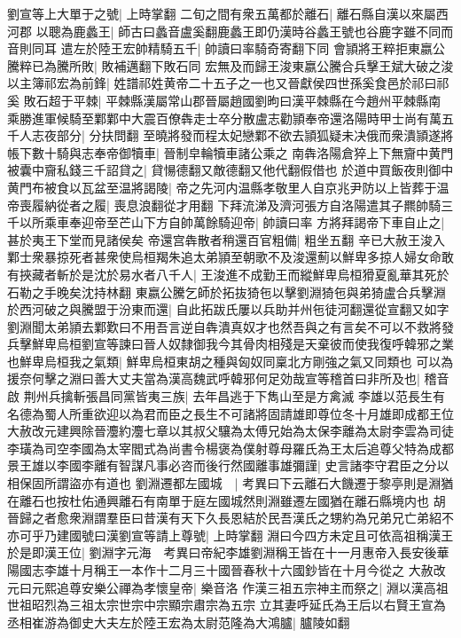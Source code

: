 劉宣等上大單于之號|{
	上時掌翻}
二旬之間有衆五萬都於離石|{
	離石縣自漢以來屬西河郡}
以聰為鹿蠡王|{
	師古曰蠡音盧奚翻鹿蠡王即仍漢時谷蠡王號也谷鹿字雖不同而音則同耳}
遣左於陸王宏帥精騎五千|{
	帥讀曰率騎奇寄翻下同}
會頴將王粹拒東嬴公騰粹已為騰所敗|{
	敗補邁翻下敗石同}
宏無及而歸王浚東嬴公騰合兵擊王斌大破之浚以主簿祁宏為前鋒|{
	姓譜祁姓黄帝二十五子之一也又晉獻侯四世孫奚食邑於祁曰祁奚}
敗石超于平棘|{
	平棘縣漢屬常山郡晉屬趙國劉昫曰漢平棘縣在今趙州平棘縣南}
乘勝進軍候騎至鄴鄴中大震百僚犇走士卒分散盧志勸頴奉帝還洛陽時甲士尚有萬五千人志夜部分|{
	分扶問翻}
至曉將發而程太妃戀鄴不欲去頴狐疑未决俄而衆潰頴遂將帳下數十騎與志奉帝御犢車|{
	晉制皁輪犢車諸公乘之}
南犇洛陽倉猝上下無齎中黄門被囊中齎私錢三千詔貸之|{
	貸愓德翻又敵德翻又他代翻假借也}
於道中買飯夜則御中黄門布被食以瓦盆至温將謁陵|{
	帝之先河内温縣孝敬里人自京兆尹防以上皆葬于温}
帝喪履納從者之履|{
	喪息浪翻從才用翻}
下拜流涕及濟河張方自洛陽遣其子羆帥騎三千以所乘車奉迎帝至芒山下方自帥萬餘騎迎帝|{
	帥讀曰率}
方將拜謁帝下車自止之|{
	甚於夷王下堂而見諸侯矣}
帝還宫犇散者稍還百官粗備|{
	粗坐五翻}
辛已大赦王浚入鄴士衆暴掠死者甚衆使烏桓羯朱追太弟頴至朝歌不及浚還薊以鮮卑多掠人婦女命敢有挾藏者斬於是沈於易水者八千人|{
	王浚進不成勤王而縱鮮卑烏桓猾夏亂華其死於石勒之手晚矣沈持林翻}
東嬴公騰乞師於拓抜猗㐌以擊劉淵猗㐌與弟猗盧合兵擊淵於西河破之與騰盟于汾東而還|{
	自此拓跋氏屢以兵助并州㐌徒河翻還從宣翻又如字}
劉淵聞太弟頴去鄴歎曰不用吾言逆自犇潰真奴才也然吾與之有言矣不可以不救將發兵擊鮮卑烏桓劉宣等諫曰晉人奴隸御我今其骨肉相殘是天棄彼而使我復呼韓邪之業也鮮卑烏桓我之氣類|{
	鮮卑烏桓東胡之種與匈奴同稟北方剛強之氣又同類也}
可以為援奈何擊之淵曰善大丈夫當為漢高魏武呼韓邪何足効哉宣等稽首曰非所及也|{
	稽音啟}
荆州兵擒斬張昌同黨皆夷三族|{
	去年昌逃于下雋山至是方禽滅}
李雄以范長生有名德為蜀人所重欲迎以為君而臣之長生不可諸將固請雄即尊位冬十月雄即成都王位大赦改元建興除晉灋約灋七章以其叔父驤為太傅兄始為太保李離為太尉李雲為司徒李璜為司空李國為太宰閻式為尚書令楊褒為僕射尊母羅氏為王太后追尊父特為成都景王雄以李國李離有智謀凡事必咨而後行然國離事雄彌謹|{
	史言諸李守君臣之分以相保固所謂盜亦有道也}
劉淵遷都左國城　|{
	考異曰下云離石大饑遷于黎亭則是淵猶在離石也按杜佑通興離石有南單于庭左國城然則淵雖遷左國猶在離石縣境内也}
胡晉歸之者愈衆淵謂羣臣曰昔漢有天下久長恩結於民吾漢氏之甥約為兄弟兄亡弟紹不亦可乎乃建國號曰漢劉宣等請上尊號|{
	上時掌翻}
淵曰今四方未定且可依高祖稱漢王於是即漢王位|{
	劉淵字元海　考異曰帝紀李雄劉淵稱王皆在十一月惠帝入長安後華陽國志李雄十月稱王一本作十二月三十國晉春秋十六國鈔皆在十月今從之}
大赦改元曰元熙追尊安樂公禪為孝懷皇帝|{
	樂音洛}
作漢三祖五宗神主而祭之|{
	淵以漢高祖世祖昭烈為三祖太宗世宗中宗顯宗肅宗為五宗}
立其妻呼延氏為王后以右賢王宣為丞相崔游為御史大夫左於陸王宏為太尉范隆為大鴻臚|{
	臚陵如翻}
